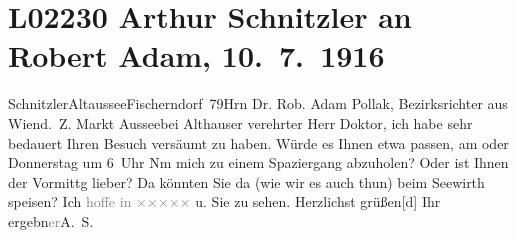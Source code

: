 

\section[Arthur Schnitzler an Robert Adam, 10. 7. 1916]{L02230 Arthur Schnitzler an Robert Adam, 10. 7. 1916}
\nopagebreak{}
\rehead{ }\normalsize\beginnumbering{}
\toendnotes[C]{\smallbreak\pagebreak[2]}
\toendnotes[C]{\smallbreak}\pstart{}{\pb}Schnitzler\pend{}\pstart{}Altaussee\pend{}\pstart{}Fischerndorf 79\pend{}{\bigskip}\pstart{}Hrn Dr. Rob. Adam Pollak, Bezirksrichter aus Wien\pend{}\pstart{}d. Z. Markt Aussee\pend{}\pstart{}bei Althauser\pend{}{\bigskip}\vspace{1em}
\pstart
           \noindent{}{\pb}verehrter Herr Doktor, ich habe sehr bedauert Ihren Besuch versäumt
               zu haben. Würde es Ihnen etwa passen, am \label{K_L02230-1v}\label{K_L02230-1} oder Donnerstag um 6 Uhr Nm mich zu einem
               Spaziergang abzuholen? Oder ist Ihnen der Vormittg lieber? Da könnten Sie da{\geminationn} (wie wir es auch thun) beim Seewirth speisen? Ich \textcolor{gray}{hoffe in }{ }\textcolor{gray}{×}\-\textcolor{gray}{×}\-\textcolor{gray}{×}\-\textcolor{gray}{×}\-\textcolor{gray}{×} u. Sie zu sehen. Herzlichst
                  grüßen{[}d{]} Ihr ergebn\textcolor{gray}{er}\spacefill\mbox{A. S.}\pend
           \endnumbering{}  
      